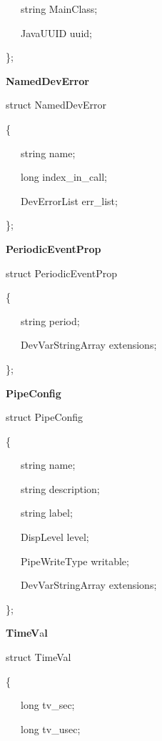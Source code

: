 ~~~string MainClass;

~~~JavaUUID uuid;

\};\\

\begin{flushleft}
\textbf{NamedDevError}
\par\end{flushleft}

struct NamedDevError

\{

~~~string name;

~~~long index\_in\_call;

~~~DevErrorList err\_list;

\};\\

\begin{flushleft}
\textbf{PeriodicEventProp}
\par\end{flushleft}

struct PeriodicEventProp

\{

~~~string period;

~~~DevVarStringArray extensions;

\};\\

\begin{flushleft}
\textbf{PipeConfig}
\par\end{flushleft}

struct PipeConfig

\{

~~~string name;

~~~string description;

~~~string label;

~~~DispLevel level;

~~~PipeWriteType writable;

~~~DevVarStringArray extensions;

\};\\

\begin{flushleft}
\textbf{TimeV}a\textbf{l}
\par\end{flushleft}

struct TimeVal

\{

~~~long tv\_sec;

~~~long tv\_usec;

